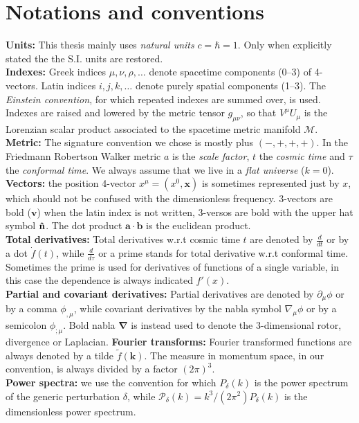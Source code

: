 \section*{Notations and conventions}
\vspace*{\fill}
\textbf{Units:} This thesis mainly uses \emph{natural units} $c=\hbar=1$. Only when explicitly stated the the S.I. units are restored.\\  
\textbf{Indexes:} Greek indices $\mu,\nu,\rho,\dots$ denote spacetime components (0--3) of 4-vectors. Latin indices $i,j,k,\dots$ denote purely spatial components (1--3). The \emph{Einstein convention}, for which repeated indexes are summed over, is used. Indexes are raised and lowered by the metric tensor $g_{\mu\nu}$, so that $V^\mu U_\mu$ is the Lorenzian scalar product associated to the spacetime metric manifold $\mathcal M$.  \\
\textbf{Metric:} The signature convention we chose is mostly plus $(-,+,+,+)$. In the Friedmann Robertson Walker metric $a$ is the \emph{scale factor}, $t$ the \emph{cosmic time} and $\tau$ the \emph{conformal time}. We always assume that we live in a \emph{flat universe} ($k=0$).\\
\textbf{Vectors:} the position 4-vector $x^\mu=(x^0,\mathbf x)$ is sometimes represented just by $x$, which should not be confused with the dimensionless frequency. 3-vectors are bold ($\mathbf v$) when the latin index is not written, 3-versos are bold with the upper hat symbol $\mathbf{\hat{n}}$. The dot product $\mathbf{a\cdot b}$ is the euclidean product. \\
\textbf{Total derivatives:} Total derivatives w.r.t cosmic time $t$ are denoted by $\tfrac d{dt}$ or by a dot $\dot f(t)$, while $\tfrac d{d\tau}$ or a prime stands for total derivative w.r.t conformal time. Sometimes the prime is used for derivatives of functions of a single variable, in this case the dependence is always indicated $f'(x)$.\\
\textbf{Partial and covariant derivatives:} Partial derivatives are denoted by $\partial_\mu\phi$ or by a comma $\phi_{,\mu}$, while covariant derivatives by the nabla symbol $\nabla_\mu\phi$ or by a semicolon $\phi_{;\mu}$. Bold nabla $\boldsymbol\nabla$ is instead used to denote the 3-dimensional rotor, divergence or Laplacian.
\textbf{Fourier transforms:} Fourier transformed functions are always denoted by a tilde $\tilde f(\mathbf k)$. The measure in momentum space, in our convention, is always divided by a factor $(2\pi)^3$.  \\
\textbf{Power spectra:} we use the convention for which $P_\delta(k)$ is the power spectrum of the generic perturbation $\delta$, while $\mathcal P_\delta(k)=k^3/(2\pi^2) P_\delta(k)$ is the dimensionless power spectrum. 